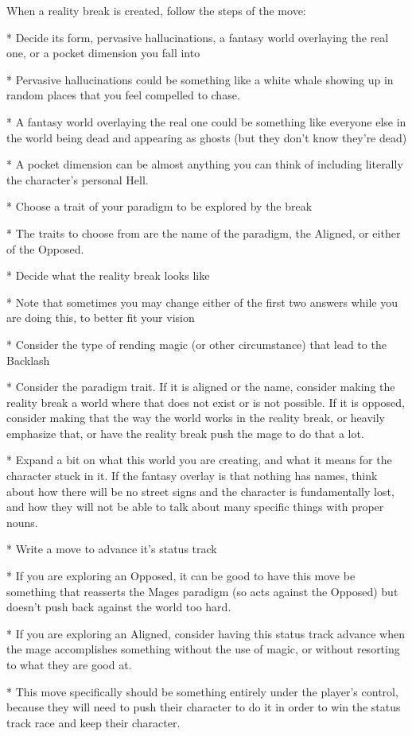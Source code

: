 \documentclass[
  oneside,
  statementpaper,
  9pt]{memoir}
\begin{document}
\begin{MC}
When a reality break is created, follow the steps of the move: 

* Decide its form, pervasive hallucinations, a fantasy world overlaying the real one, or a pocket dimension you fall into

    * Pervasive hallucinations could be something like a white whale showing up in random places that you feel compelled to chase.

    * A fantasy world overlaying the real one could be something like everyone else in the world being dead and appearing as ghosts (but they don’t know they’re dead)

    * A pocket dimension can be almost anything you can think of including literally the character’s personal Hell.

* Choose a trait of your paradigm to be explored by the break

    * The traits to choose from are the name of the paradigm, the Aligned, or either of the Opposed.

* Decide what the reality break looks like

    * Note that sometimes you may change either of the first two answers while you are doing this, to better fit your vision

    * Consider the type of rending magic (or other circumstance) that lead to the Backlash

    * Consider the paradigm trait. If it is aligned or the name, consider making the reality break a world where that does not exist or is not possible. If it is opposed, consider making that the way the world works in the reality break, or heavily emphasize that, or have the reality break push the mage to do that a lot.

    * Expand a bit on what this world you are creating, and what it means for the character stuck in it. If the fantasy overlay is that nothing has names, think about how there will be no street signs and the character is fundamentally lost, and how they will not be able to talk about many specific things with proper nouns.

* Write a move to advance it’s status track

    * If you are exploring an Opposed, it can be good to have this move be something that reasserts the Mages paradigm (so acts against the Opposed) but doesn't push back against the world too hard.
    
    * If you are exploring an Aligned, consider having this status track advance when the mage accomplishes something without the use of magic, or without resorting to what they are good at.

    * This move specifically should be something entirely under the player’s control, because they will need to push their character to do it in order to win the status track race and keep their character.

\end{MC}
\end{document}
